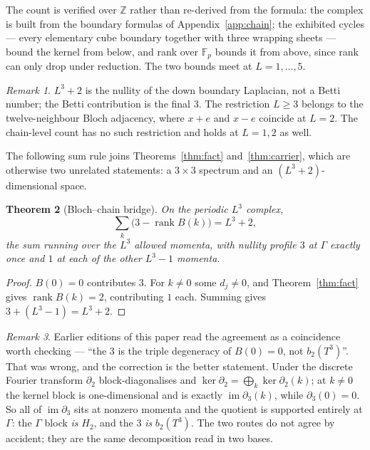 \documentclass[11pt]{article}
\theoremstyle{plain}
\newtheorem{theorem}{Theorem}
\theoremstyle{definition}
\theoremstyle{remark}
\newtheorem{remark}[theorem]{Remark}
\newcommand{\chk}[1]{}
\begin{document}
The count is verified over $\mathbb{Z}$ rather than re-derived from the
formula: the complex is built from the boundary formulas of
Appendix~\ref{app:chain}; the exhibited cycles --- every elementary cube
boundary together with three wrapping sheets --- bound the kernel from below,
and rank over $\mathbb{F}_p$ bounds it from above, since rank can only drop
under reduction. The two bounds meet at $L=1,\dots,5$.
\chk{dim Z\_2 = L\^{}3 + 2 by rank, not by re-arranging the formula}
\chk{cube boundaries and three wrapping sheets SPAN Z\_2}

\begin{remark}
$L^3+2$ is the nullity of the down boundary Laplacian, not a Betti number; the
Betti contribution is the final $3$. The restriction $L\ge3$ belongs to the
twelve-neighbour Bloch adjacency, where $x+e$ and $x-e$ coincide at $L=2$. The
chain-level count has no such restriction and holds at $L=1,2$ as well.
\chk{the L\^{}3+2 count is chain-level, not the Bloch convention}
\end{remark}

The following sum rule joins Theorems~\ref{thm:fact} and~\ref{thm:carrier},
which are otherwise two unrelated statements: a $3\times3$ spectrum and an
$(L^3+2)$-dimensional space.

\begin{theorem}[Bloch--chain bridge]\label{thm:bridge}
On the periodic $L^3$ complex,
\[
  \sum_{k}\bigl(3-\operatorname{rank}B(k)\bigr)=L^3+2 ,
\]
the sum running over the $L^3$ allowed momenta, with nullity profile
$3$ at $\Gamma$ exactly once and $1$ at each of the other $L^3-1$ momenta.
\end{theorem}

\begin{proof}
$B(0)=0$ contributes $3$. For $k\neq0$ some $d_j\neq0$, and
Theorem~\ref{thm:fact} gives $\operatorname{rank}B(k)=2$, contributing $1$
each. Summing gives $3+(L^3-1)=L^3+2$.
\end{proof}
\chk{the Bloch and chain routes to the carrier agree}

\begin{remark}\label{rem:bridge}
Earlier editions of this paper read the agreement as a coincidence worth
checking --- ``the $3$ is the triple degeneracy of $B(0)=0$, not $b_2(T^3)$''.
That was wrong, and the correction is the better statement. Under the discrete
Fourier transform $\partial_2$ block-diagonalises and
$\ker\partial_2=\bigoplus_k\ker\partial_2(k)$; at $k\neq0$ the kernel block is
one-dimensional and is exactly $\operatorname{im}\partial_3(k)$, while
$\partial_3(0)=0$. So all of $\operatorname{im}\partial_3$ sits at nonzero
momenta and the quotient is supported entirely at $\Gamma$: the $\Gamma$ block
\emph{is} $H_2$, and the $3$ \emph{is} $b_2(T^3)$. The two routes do not agree
by accident; they are the same decomposition read in two bases.
\chk{the sheets average to harmonic representatives, and the Gamma block IS b\_2}
\end{remark}
\end{document}
